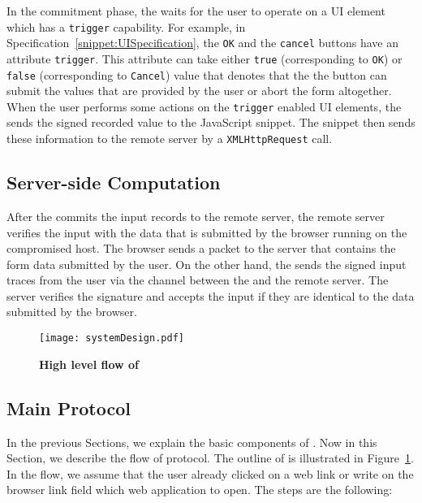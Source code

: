  In the commitment phase, the \device waits for the user to operate on a UI element which has a \texttt{trigger} capability. For example, in Specification~\ref{snippet:UISpecification}, the \texttt{OK} and the \texttt{cancel} buttons have an attribute \texttt{trigger}. This attribute can take either \texttt{true} (corresponding to \texttt{OK}) or \texttt{false} (corresponding to \texttt{Cancel}) value that denotes that the the button can submit the values that are provided by the user or abort the form altogether. When the user performs some actions on the \texttt{trigger} enabled UI elements, the \device sends the signed recorded value to the \name JavaScript snippet. The \name \js snippet then sends these information to the remote server by a \texttt{XMLHttpRequest} call.   


\subsection{Server-side Computation}
\label{sec:systemDesign:serverSide}

After the \device commits the input records to the remote server, the remote server verifies the input with the data that is submitted by the browser running on the compromised host. The browser sends a \http packet to the server that contains the form data submitted by the user. On the other hand, the \device sends the signed input traces from the user via the \tls channel between the \device and the remote server. The server verifies the signature and accepts the input if they are identical to the data submitted by the browser.

\begin{figure}[t]
\centering
\texttt{[image: systemDesign.pdf]}
\caption{\textbf{High level flow of \name}}
\label{fig:systemDesign}
\centering
\end{figure}

\subsection{Main Protocol}
\label{sec:systemDesign:mainProtocol}

In the previous Sections, we explain the basic components of \name. Now in this Section, we describe the flow of \name protocol. The outline of \name is illustrated in Figure~\ref{fig:systemDesign}. In the flow, we assume that the user already clicked on a web link or write on the browser link field which web application to open. The steps are the following:


